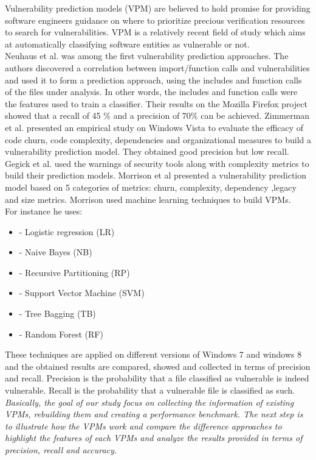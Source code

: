 \documentclass[twocolumn,10pt]{asme2ej}
\begin{document}
Vulnerability prediction models (VPM) are believed to hold promise for providing software engineers guidance on where to prioritize precious verification resources to search for vulnerabilities.
VPM is a relatively recent field of study which aims at automatically classifying software entities as vulnerable or not.\\
Neuhaus et al. \cite{Neuhaus} was among the first vulnerability prediction approaches. The authors discovered a correlation between import/function calls and vulnerabilities and used it to form a prediction approach, using the includes and function calls of the files under analysis. In other words, the includes and function calls were the features used to train a classifier. Their results on the Mozilla Firefox project showed that a recall of 45 \% and a precision of 70\% can be achieved.
Zimmerman et al. \cite{Zimmermann} presented an empirical study on Windows Vista to evaluate the efficacy of code churn, code complexity, dependencies and organizational measures to build a vulnerability prediction model. They obtained good precision but low recall.
Gegick et al. \cite{Gegick} used the warnings of security tools along with complexity metrics to build their prediction models.
Morrison et al \cite{Morrison}  presented a vulnerability prediction model based on 5 categories of metrics: churn, complexity, dependency ,legacy and size metrics. Morrison used machine learning techniques to build VPMs. \\For instance he uses:
\begin{itemize}
    \item - Logistic regression (LR)
    \item - Naive Bayes (NB)
    \item - Recursive Partitioning (RP)
    \item - Support Vector Machine (SVM)
    \item - Tree Bagging (TB)
    \item - Random Forest (RF)
\end{itemize}
These techniques are applied on different versions of Windows 7 and windows 8 and the obtained results are compared, showed and collected in terms of precision and recall.
Precision is the probability that a file classified as vulnerable is indeed vulnerable.
Recall is the probability that a vulnerable file is classified as such.\\

\textit{Basically, the goal of our study focus on collecting the information of existing VPMs, rebuilding them and creating a performance benchmark. The next step is to illustrate how the VPMs work and compare the difference approaches to highlight the features of each VPMs and analyze the results provided in terms of precision, recall and accuracy. }
\end{document}

